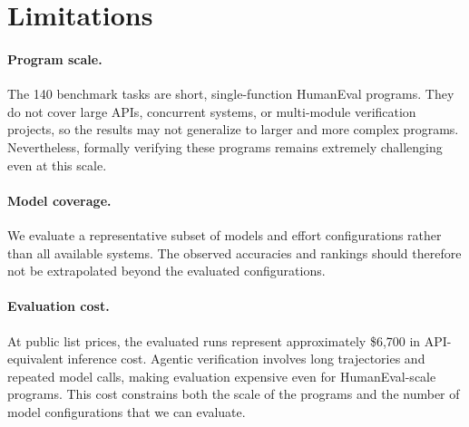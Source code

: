 \section{Limitations}
\label{sec:threats-validity}

\paragraph{Program scale.}
The 140 benchmark tasks are short, single-function HumanEval programs. They do not cover large APIs, concurrent systems, or multi-module verification projects, so the results may not generalize to larger and more complex programs. Nevertheless, formally verifying these programs remains extremely challenging even at this scale.

\paragraph{Model coverage.}
We evaluate a representative subset of models and effort configurations rather than all available systems. The observed accuracies and rankings should therefore not be extrapolated beyond the evaluated configurations.

\paragraph{Evaluation cost.}
At public list prices, the evaluated runs represent approximately \$6,700 in API-equivalent inference cost. Agentic verification involves long trajectories and repeated model calls, making evaluation expensive even for HumanEval-scale programs. This cost constrains both the scale of the programs and the number of model configurations that we can evaluate.
